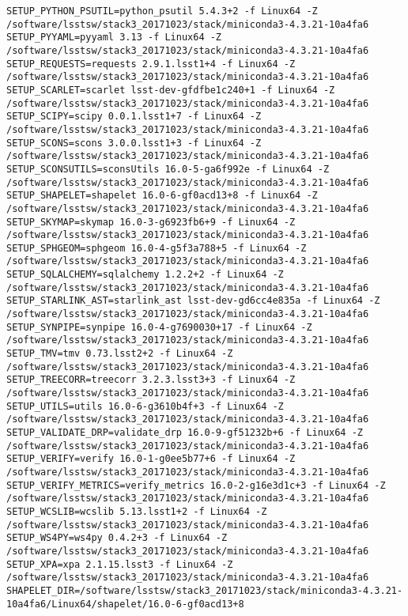 \begin{verbatim}
SETUP_PYTHON_PSUTIL=python_psutil 5.4.3+2 -f Linux64 -Z /software/lsstsw/stack3_20171023/stack/miniconda3-4.3.21-10a4fa6
SETUP_PYYAML=pyyaml 3.13 -f Linux64 -Z /software/lsstsw/stack3_20171023/stack/miniconda3-4.3.21-10a4fa6
SETUP_REQUESTS=requests 2.9.1.lsst1+4 -f Linux64 -Z /software/lsstsw/stack3_20171023/stack/miniconda3-4.3.21-10a4fa6
SETUP_SCARLET=scarlet lsst-dev-gfdfbe1c240+1 -f Linux64 -Z /software/lsstsw/stack3_20171023/stack/miniconda3-4.3.21-10a4fa6
SETUP_SCIPY=scipy 0.0.1.lsst1+7 -f Linux64 -Z /software/lsstsw/stack3_20171023/stack/miniconda3-4.3.21-10a4fa6
SETUP_SCONS=scons 3.0.0.lsst1+3 -f Linux64 -Z /software/lsstsw/stack3_20171023/stack/miniconda3-4.3.21-10a4fa6
SETUP_SCONSUTILS=sconsUtils 16.0-5-ga6f992e -f Linux64 -Z /software/lsstsw/stack3_20171023/stack/miniconda3-4.3.21-10a4fa6
SETUP_SHAPELET=shapelet 16.0-6-gf0acd13+8 -f Linux64 -Z /software/lsstsw/stack3_20171023/stack/miniconda3-4.3.21-10a4fa6
SETUP_SKYMAP=skymap 16.0-3-g6923fb6+9 -f Linux64 -Z /software/lsstsw/stack3_20171023/stack/miniconda3-4.3.21-10a4fa6
SETUP_SPHGEOM=sphgeom 16.0-4-g5f3a788+5 -f Linux64 -Z /software/lsstsw/stack3_20171023/stack/miniconda3-4.3.21-10a4fa6
SETUP_SQLALCHEMY=sqlalchemy 1.2.2+2 -f Linux64 -Z /software/lsstsw/stack3_20171023/stack/miniconda3-4.3.21-10a4fa6
SETUP_STARLINK_AST=starlink_ast lsst-dev-gd6cc4e835a -f Linux64 -Z /software/lsstsw/stack3_20171023/stack/miniconda3-4.3.21-10a4fa6
SETUP_SYNPIPE=synpipe 16.0-4-g7690030+17 -f Linux64 -Z /software/lsstsw/stack3_20171023/stack/miniconda3-4.3.21-10a4fa6
SETUP_TMV=tmv 0.73.lsst2+2 -f Linux64 -Z /software/lsstsw/stack3_20171023/stack/miniconda3-4.3.21-10a4fa6
SETUP_TREECORR=treecorr 3.2.3.lsst3+3 -f Linux64 -Z /software/lsstsw/stack3_20171023/stack/miniconda3-4.3.21-10a4fa6
SETUP_UTILS=utils 16.0-6-g3610b4f+3 -f Linux64 -Z /software/lsstsw/stack3_20171023/stack/miniconda3-4.3.21-10a4fa6
SETUP_VALIDATE_DRP=validate_drp 16.0-9-gf51232b+6 -f Linux64 -Z /software/lsstsw/stack3_20171023/stack/miniconda3-4.3.21-10a4fa6
SETUP_VERIFY=verify 16.0-1-g0ee5b77+6 -f Linux64 -Z /software/lsstsw/stack3_20171023/stack/miniconda3-4.3.21-10a4fa6
SETUP_VERIFY_METRICS=verify_metrics 16.0-2-g16e3d1c+3 -f Linux64 -Z /software/lsstsw/stack3_20171023/stack/miniconda3-4.3.21-10a4fa6
SETUP_WCSLIB=wcslib 5.13.lsst1+2 -f Linux64 -Z /software/lsstsw/stack3_20171023/stack/miniconda3-4.3.21-10a4fa6
SETUP_WS4PY=ws4py 0.4.2+3 -f Linux64 -Z /software/lsstsw/stack3_20171023/stack/miniconda3-4.3.21-10a4fa6
SETUP_XPA=xpa 2.1.15.lsst3 -f Linux64 -Z /software/lsstsw/stack3_20171023/stack/miniconda3-4.3.21-10a4fa6
SHAPELET_DIR=/software/lsstsw/stack3_20171023/stack/miniconda3-4.3.21-10a4fa6/Linux64/shapelet/16.0-6-gf0acd13+8

\end{verbatim}
